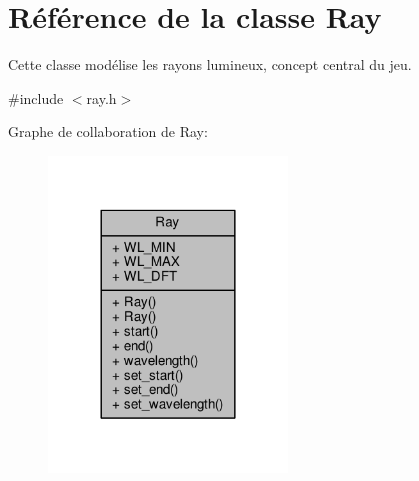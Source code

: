 \hypertarget{classRay}{\section{Référence de la classe Ray}
\label{classRay}
}


Cette classe modélise les rayons lumineux, concept central du jeu.  




{\ttfamily \#include $<$ray.\+h$>$}



Graphe de collaboration de Ray\+:\nopagebreak
\begin{figure}[H]
\begin{center}
\leavevmode
\includegraphics[width=180pt]{db/d2b/classRay__coll__graph}
\end{center}
\end{figure}
